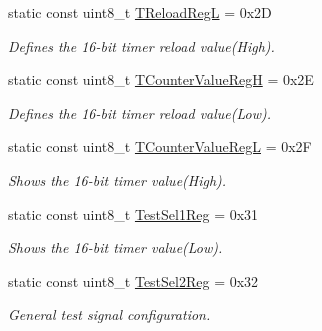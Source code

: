 \begin{DoxyCompactItemize}
\mbox{\label{classMFRC522_ab8ee05c49c5895b521f35b413c8832c5}} 
static const uint8\+\_\+t \hyperlink{classMFRC522_ab8ee05c49c5895b521f35b413c8832c5}{T\+Reload\+RegL} = 0x2D
\begin{DoxyCompactList}\small\item\em Defines the 16-\/bit timer reload value(\+High). \end{DoxyCompactList}\item 
\mbox{\label{classMFRC522_a457f1df041869fe30a5c01b9a628edd8}} 
static const uint8\+\_\+t \hyperlink{classMFRC522_a457f1df041869fe30a5c01b9a628edd8}{T\+Counter\+Value\+RegH} = 0x2E
\begin{DoxyCompactList}\small\item\em Defines the 16-\/bit timer reload value(\+Low). \end{DoxyCompactList}\item 
\mbox{\label{classMFRC522_addf045e6b7636472c27caec39eeb902b}} 
static const uint8\+\_\+t \hyperlink{classMFRC522_addf045e6b7636472c27caec39eeb902b}{T\+Counter\+Value\+RegL} = 0x2F
\begin{DoxyCompactList}\small\item\em Shows the 16-\/bit timer value(\+High). \end{DoxyCompactList}\item 
\mbox{\label{classMFRC522_a82581733220799c91c85268e5e453519}} 
static const uint8\+\_\+t \hyperlink{classMFRC522_a82581733220799c91c85268e5e453519}{Test\+Sel1\+Reg} = 0x31
\begin{DoxyCompactList}\small\item\em Shows the 16-\/bit timer value(\+Low). \end{DoxyCompactList}\item 
\mbox{\label{classMFRC522_a2254d965da14ff4d6de9fd7f3b214eab}} 
static const uint8\+\_\+t \hyperlink{classMFRC522_a2254d965da14ff4d6de9fd7f3b214eab}{Test\+Sel2\+Reg} = 0x32
\begin{DoxyCompactList}\small\item\em General test signal configuration. \end{DoxyCompactList}\item 
\mbox{\label{classMFRC522_a0b73879826d5984c9ce1c9b8eb7403b2}} 

\end{DoxyCompactItemize}
